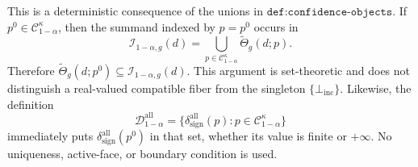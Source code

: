 This is a deterministic consequence of the unions in \(\texttt{def:confidence-objects}\).  If \(p^0\in\mathcal C_{1-\alpha}^{\kappa}\), then the summand indexed by \(p=p^0\) occurs in
\[
 \mathcal I_{1-\alpha,g}(d)
 =\bigcup_{p\in\mathcal C_{1-\alpha}^{\kappa}}
   \widetilde\Theta_g(d;p).
\]
Therefore \(\widetilde\Theta_g(d;p^0)\subseteq\mathcal I_{1-\alpha,g}(d)\).  This argument is set-theoretic and does not distinguish a real-valued compatible fiber from the singleton \(\{\bot_{\mathrm{inc}}\}\).  Likewise, the definition
\[
 \mathcal D_{1-\alpha}^{\mathrm{all}}
 =\{\delta_{\mathrm{sign}}^{\mathrm{all}}(p):
      p\in\mathcal C_{1-\alpha}^{\kappa}\}
\]
immediately puts \(\delta_{\mathrm{sign}}^{\mathrm{all}}(p^0)\) in that set, whether its value is finite or \(+\infty\).  No uniqueness, active-face, or boundary condition is used.